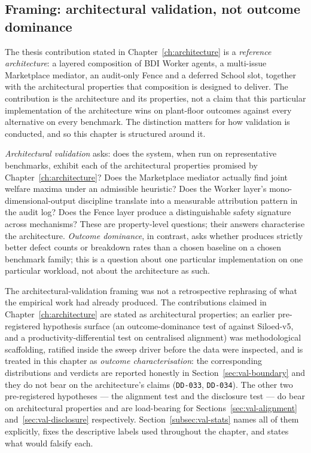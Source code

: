 \subsection{Framing: architectural validation, not outcome dominance}
\label{subsec:val-framing}

The thesis contribution stated in Chapter~\ref{ch:architecture} is a
\emph{reference architecture}: a layered composition of BDI Worker
agents, a multi-issue Marketplace mediator, an audit-only Fence and a
deferred School slot, together with the architectural properties that
composition is designed to deliver. The contribution is the
architecture and its properties, not a claim that this particular
implementation of the architecture wins on plant-floor outcomes
against every alternative on every benchmark. The distinction matters
for how validation is conducted, and so this chapter is structured
around it.

\emph{Architectural validation} asks: does the system, when run on
representative benchmarks, exhibit each of the architectural properties
promised by Chapter~\ref{ch:architecture}? Does the Marketplace
mediator actually find joint welfare maxima under an admissible
heuristic? Does the Worker layer's mono-dimensional-output discipline
translate into a measurable attribution pattern in the audit log?
Does the Fence layer produce a distinguishable safety signature
across mechanisms? These are property-level questions; their answers
characterise the architecture. \emph{Outcome dominance}, in contrast,
asks whether \NEXUS{} produces strictly better defect counts or
breakdown rates than a chosen baseline on a chosen benchmark family;
this is a question about one particular implementation on one
particular workload, not about the architecture as such.

The architectural-validation framing was not a retrospective
rephrasing of what the empirical work had already produced. The
contributions claimed in Chapter~\ref{ch:architecture} are stated as
architectural properties; an earlier pre-registered hypothesis surface
(an outcome-dominance test of \NEXUS{} against Siloed-v5, and a
productivity-differential test on centralised alignment) was
methodological scaffolding, ratified inside the sweep driver before
the data were inspected, and is treated in this chapter as
\emph{outcome characterisation}: the corresponding distributions and
verdicts are reported honestly in Section~\ref{sec:val-boundary} and
they do not bear on the architecture's claims (\texttt{DD-033},
\texttt{DD-034}). The other two pre-registered hypotheses --- the
alignment test and the disclosure test --- do bear on architectural
properties and are load-bearing for
Sections~\ref{sec:val-alignment} and~\ref{sec:val-disclosure}
respectively. Section~\ref{subsec:val-stats} names all of them
explicitly, fixes the descriptive labels used throughout the
chapter, and states what would falsify each.

